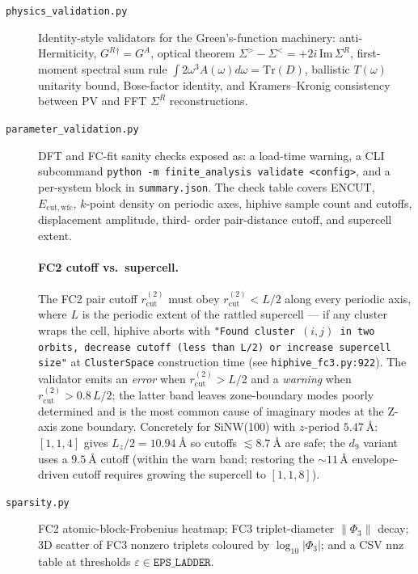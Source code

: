 \begin{description}
\item[\texttt{physics\_validation.py}] Identity-style validators for the
  Green's-function machinery: anti-Hermiticity, $G^R{}^\dagger = G^A$,
  optical theorem $\Sigma^> - \Sigma^< = +2i\,\mathrm{Im}\,\Sigma^R$,
  first-moment spectral sum rule
  $\int 2\omega^3 A(\omega) d\omega = \mathrm{Tr}(D)$, ballistic
  $T(\omega)$ unitarity bound, Bose-factor identity, and
  Kramers--Kronig consistency between PV and FFT $\Sigma^R$
  reconstructions.

\item[\texttt{parameter\_validation.py}] DFT and FC-fit sanity checks
  exposed as: a load-time warning, a CLI subcommand
  \verb|python -m finite_analysis validate <config>|, and a
  per-system block in \texttt{summary.json}.  The check table covers
  ENCUT, $E_{\mathrm{cut,wfc}}$, $k$-point density on periodic axes,
  hiphive sample count and cutoffs, displacement amplitude, third-
  order pair-distance cutoff, and supercell extent.

  \paragraph{FC2 cutoff vs.\ supercell.}  The FC2 pair cutoff
  $r_\mathrm{cut}^{(2)}$ must obey $r_\mathrm{cut}^{(2)} < L/2$ along
  every periodic axis, where $L$ is the periodic extent of the
  rattled supercell --- if any cluster wraps the cell, hiphive aborts
  with \texttt{"Found cluster $(i,j)$ in two orbits, decrease cutoff
  (less than L/2) or increase supercell size"} at
  \texttt{ClusterSpace} construction time (see
  \texttt{hiphive\_fc3.py:922}).  The validator emits an
  \emph{error} when $r_\mathrm{cut}^{(2)} > L/2$ and a \emph{warning}
  when $r_\mathrm{cut}^{(2)} > 0.8\,L/2$; the latter band leaves
  zone-boundary modes poorly determined and is the most common cause
  of imaginary modes at the Z-axis zone boundary.  Concretely for
  SiNW(100) with $z$-period $\qty{5.47}{\angstrom}$:
  $[1,1,4]$ gives $L_z/2 = \qty{10.94}{\angstrom}$ so cutoffs
  $\lesssim \qty{8.7}{\angstrom}$ are safe; the $d_9$ variant uses a
  $\qty{9.5}{\angstrom}$ cutoff (within the warn band; restoring the
  $\sim\!11\,\text{\AA}$ envelope-driven cutoff requires growing the
  supercell to $[1,1,8]$).

\item[\texttt{sparsity.py}] FC2 atomic-block-Frobenius heatmap; FC3
  triplet-diameter $\|\Phi_3\|$ decay; 3D scatter of FC3 nonzero
  triplets coloured by $\log_{10}|\Phi_3|$; and a CSV nnz table at
  thresholds $\varepsilon\in\texttt{EPS\_LADDER}$.


\end{description}
